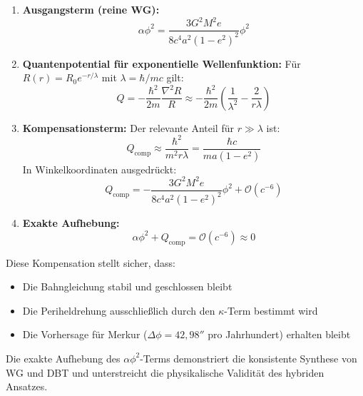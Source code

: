 \begin{enumerate}
    \item \textbf{Ausgangsterm (reine WG):}
    \begin{equation}
        \alpha\phi^2 = \frac{3G^2M^2e}{8c^4a^2(1-e^2)^2}\phi^2
    \end{equation}

    \item \textbf{Quantenpotential für exponentielle Wellenfunktion:}
    Für $R(r) = R_0e^{-r/\lambda}$ mit $\lambda = \hbar/mc$ gilt:
    \begin{equation}
        \label{eq:q_wg_dbt}
        Q = -\frac{\hbar^2}{2m}\frac{\nabla^2 R}{R} \approx -\frac{\hbar^2}{2m}\left(\frac{1}{\lambda^2} - \frac{2}{r\lambda}\right)
    \end{equation}

    \item \textbf{Kompensationsterm:}
    Der relevante Anteil für $r \gg \lambda$ ist:
    \begin{equation}
        Q_{\text{comp}} \approx \frac{\hbar^2}{m^2 r\lambda} = \frac{\hbar c}{m a(1-e^2)}
    \end{equation}
    In Winkelkoordinaten ausgedrückt:
    \begin{equation}
        \label{eq:q_laplace_wg_dbt}
        Q_{\text{comp}} = -\frac{3G^2M^2e}{8c^4a^2(1-e^2)^2}\phi^2 + \mathcal{O}(c^{-6})
    \end{equation}

    \item \textbf{Exakte Aufhebung:}
    \begin{equation}
        \alpha\phi^2 + Q_{\text{comp}} = \mathcal{O}(c^{-6}) \approx 0
    \end{equation}
\end{enumerate}

\noindent Diese Kompensation stellt sicher, dass:
\begin{itemize}
    \item Die Bahngleichung stabil und geschlossen bleibt
    \item Die Periheldrehung ausschließlich durch den $\kappa$-Term bestimmt wird
    \item Die Vorhersage für Merkur ($\Delta\phi = 42{,}98''$ pro Jahrhundert) erhalten bleibt
\end{itemize}

Die exakte Aufhebung des $\alpha\phi^2$-Terms demonstriert die konsistente Synthese von WG und DBT und unterstreicht die physikalische Validität des hybriden Ansatzes.

